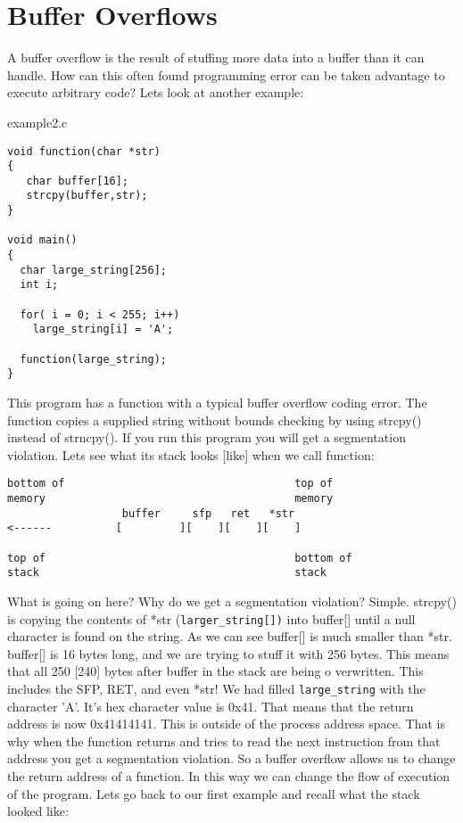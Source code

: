 \documentclass[10pt]{article}
\begin{document}
\section{Buffer Overflows}

A buffer overflow is the result of stuffing more data into a buffer than it can handle. How can this often found 
programming error can be taken advantage to execute arbitrary code? Lets look at another example:

example2.c 

\begin{lstlisting}
void function(char *str) 
{
   char buffer[16];
   strcpy(buffer,str);
}

void main() 
{
  char large_string[256];
  int i;

  for( i = 0; i < 255; i++)
    large_string[i] = 'A';

  function(large_string);
}
\end{lstlisting}

This program has a function with a typical buffer overflow coding error. The function copies a supplied string 
without bounds checking by using strcpy() instead of strncpy(). If you run this program you will get a segmentation violation. Lets see what its stack looks [like] when we call function: 

{\small
\begin{verbatim}
bottom of                                    top of
memory                                       memory
                  buffer     sfp   ret   *str
<------          [         ][    ][    ][    ]

top of                                       bottom of
stack                                        stack
\end{verbatim}
}
What is going on here? Why do we get a segmentation violation? Simple. strcpy() is copying the contents of  
*str (\verb+larger_string[])+ into buffer[] until a null character  is found on the string. As we can see buffer[] is much 
smaller than *str. buffer[] is 16 bytes long, and we are trying to stuff it with 256 bytes. This means that all 250 
[240] bytes after buffer in the stack are being o verwritten. This includes the SFP, RET, and even *str! We had 
filled \verb+large_string+ with the character 'A'. It's hex character value is 0x41. That means that the return 
address is now 0x41414141. This is outside of the process address space.  That is why when the function returns 
and tries to read the next instruction from that address you get a segmentation violation. So a buffer overflow 
allows us to change the return address of a function. In this way we can change the flow of execution of the 
program. Lets go back to our first example and recall what the stack looked like: 
\end{document}
